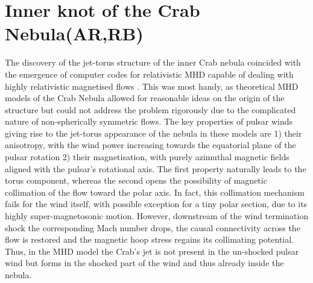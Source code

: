 \section{Inner knot of the Crab Nebula(AR,RB)}
\label{sec:knot}

The discovery of the jet-torus structure of the inner Crab nebula coincided with the emergence of computer codes for relativistic MHD capable of dealing with highly relativistic magnetised flows \citep{ssk-godun99}.  This was most handy, as theoretical MHD models of the Crab Nebula allowed for reasonable ideas on the origin of the structure but could not address the problem rigorously due to the complicated nature of non-spherically symmetric flows.   The  key properties of pulsar winds giving rise to the jet-torus 
appearance of the nebula in these models  are 1) their anisotropy, with the wind power increasing towards the equatorial plane of the pulsar rotation 2) their magnetisation, with purely azimuthal magnetic fields aligned with the pulsar’s rotational axis.  The first property naturally leads to the torus component, whereas the second opens the possibility of magnetic collimation of the flow toward the polar axis. In fact, this collimation  mechanism fails for the wind itself, with possible exception for a tiny polar section, due to its highly super-magnetosonic motion. However, downstream of the wind termination shock the corresponding Mach number drops, the causal connectivity across the flow is restored and the magnetic hoop stress regains its collimating  potential.  Thus, in the MHD model the Crab’s jet is not present in the un-shocked pulsar wind but forms in the shocked part of the wind and thus already inside the nebula.   